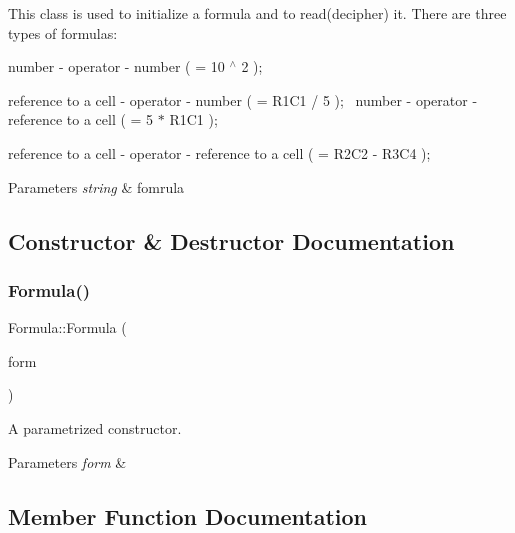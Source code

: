 This class is used to initialize a formula and to read(decipher) it. There are three types of formulas\+: ~\newline

\begin{DoxyEnumerate}
\item number -\/ operator -\/ number ( = 10 $^\wedge$ 2 );
\item reference to a cell -\/ operator -\/ number ( = R1\+C1 / 5 );~\newline
 number -\/ operator -\/ reference to a cell ( = 5 $\ast$ R1\+C1 );
\item reference to a cell -\/ operator -\/ reference to a cell ( = R2\+C2 -\/ R3\+C4 );
\end{DoxyEnumerate}


\begin{DoxyParams}{Parameters}
{\em string} & fomrula \\
\hline
\end{DoxyParams}


\subsection{Constructor \& Destructor Documentation}
\mbox{\label{class_formula_aed38ad076eb638148bcbe867d6acea60}} 
\subsubsection{\texorpdfstring{Formula()}{Formula()}}
{\footnotesize\ttfamily Formula\+::\+Formula (\begin{DoxyParamCaption}\item[{string}]{form }\end{DoxyParamCaption})\hspace{0.3cm}{\ttfamily [inline]}}

A parametrized constructor. 
\begin{DoxyParams}{Parameters}
{\em form} & \\
\hline
\end{DoxyParams}


\subsection{Member Function Documentation}
\mbox{\label{class_formula_a0f831b2ee98fbeb7df371f83ee7d374d}} 
